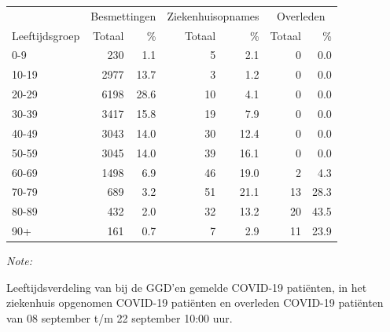 \documentclass[
  english,
  man,floatsintext]{apa6}
\begin{document}
\begin{table}[H]
\centering\begingroup\fontsize{11}{13}\selectfont

\begin{threeparttable}
\begin{tabular}{lrrrrrr}
\toprule
\multicolumn{1}{c}{ } & \multicolumn{2}{c}{Besmettingen} & \multicolumn{2}{c}{Ziekenhuisopnames} & \multicolumn{2}{c}{Overleden} \\
\cmidrule(l{3pt}r{3pt}){2-3} \cmidrule(l{3pt}r{3pt}){4-5} \cmidrule(l{3pt}r{3pt}){6-7}
Leeftijdsgroep & Totaal & \% & Totaal & \% & Totaal & \%\\
\midrule
0-9 & 230 & 1.1 & 5 & 2.1 & 0 & 0.0\\
10-19 & 2977 & 13.7 & 3 & 1.2 & 0 & 0.0\\
20-29 & 6198 & 28.6 & 10 & 4.1 & 0 & 0.0\\
30-39 & 3417 & 15.8 & 19 & 7.9 & 0 & 0.0\\
40-49 & 3043 & 14.0 & 30 & 12.4 & 0 & 0.0\\
50-59 & 3045 & 14.0 & 39 & 16.1 & 0 & 0.0\\
60-69 & 1498 & 6.9 & 46 & 19.0 & 2 & 4.3\\
70-79 & 689 & 3.2 & 51 & 21.1 & 13 & 28.3\\
80-89 & 432 & 2.0 & 32 & 13.2 & 20 & 43.5\\
90+ & 161 & 0.7 & 7 & 2.9 & 11 & 23.9\\
\bottomrule
\end{tabular}
\begin{tablenotes}
\item \textit{Note: } 
\item Leeftijdsverdeling van bij de GGD’en gemelde COVID-19 patiënten, in het ziekenhuis opgenomen COVID-19 patiënten en overleden COVID-19 patiënten van 08 september t/m 22 september 10:00 uur.
\end{tablenotes}
\end{threeparttable}
\endgroup{}
\end{table}
\end{document}
